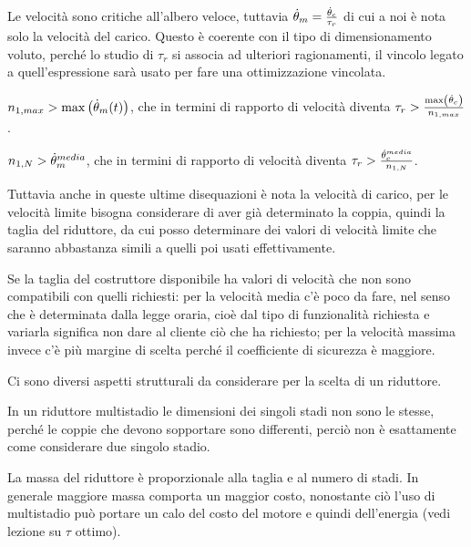 Le velocità sono critiche all'albero veloce, tuttavia $\dot{\theta}_m=\frac{\dot{\theta}_c}{\tau_r}$ di cui a noi è nota solo la velocità del carico. Questo è coerente con il tipo di dimensionamento voluto, perché lo studio di $\tau_r$ si associa ad ulteriori ragionamenti, il vincolo legato a quell'espressione sarà usato per fare una ottimizzazione vincolata.

$n_{1,max}>\operatorname{max}\left(\dot{\theta}_m(t)\right)$, che in termini di rapporto di velocità diventa $\tau_r>\frac{\operatorname{max}\left(\dot{\theta}_c\right)}{n_{1,max}}$.

$n_{1,N}>\dot{\theta}_m^{media}$, che in termini di rapporto di velocità diventa $\tau_r > \frac{\dot{\theta}_c^{media}}{n_{1,N}}$.

Tuttavia anche in queste ultime disequazioni è nota la velocità di carico, per le velocità limite bisogna considerare di aver già determinato la coppia, quindi la taglia del riduttore, da cui posso determinare dei valori di velocità limite che saranno abbastanza simili a quelli poi usati effettivamente.

Se la taglia del costruttore disponibile ha valori di velocità che non sono compatibili con quelli richiesti: per la velocità media c'è poco da fare, nel senso che è determinata dalla legge oraria, cioè dal tipo di funzionalità richiesta e variarla significa non dare al cliente ciò che ha richiesto; per la velocità massima invece c'è più margine di scelta perché il coefficiente di sicurezza è maggiore. \label{rivalutazione_coeff_sic}

Ci sono diversi aspetti strutturali da considerare per la scelta di un riduttore.

In un riduttore multistadio le dimensioni dei singoli stadi non sono le stesse, perché le coppie che devono sopportare sono differenti, perciò non è esattamente come considerare due singolo stadio.

La massa del riduttore è proporzionale alla taglia e al numero di stadi. 
In generale maggiore massa comporta un maggior costo, nonostante ciò l'uso di multistadio può portare un calo del costo del motore e quindi dell'energia (vedi lezione su $\tau$ ottimo).

